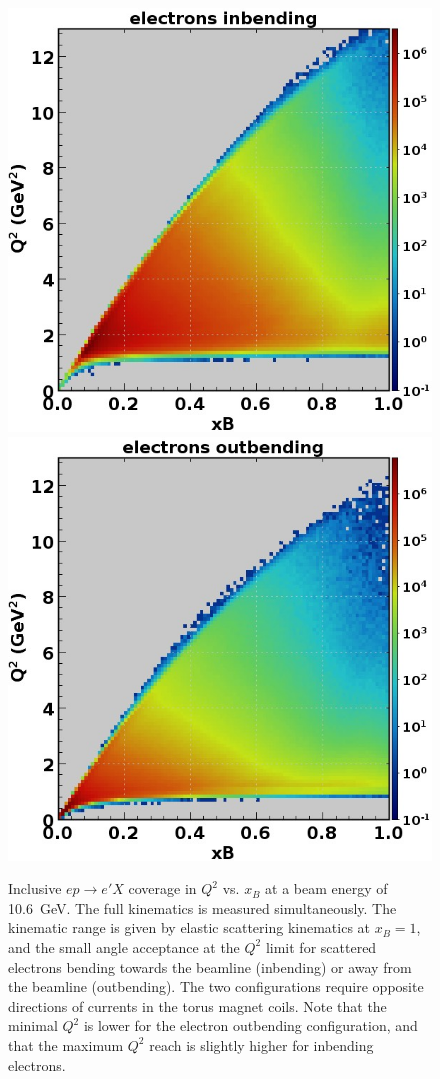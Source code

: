 \documentclass[final,3p,twocolumn]{elsarticle}
\begin{document}
\begin{figure}[th!]
\centerline{\includegraphics[width=0.9\columnwidth]{epX-in.jpg}
\hspace{1cm}\includegraphics[width=0.9\columnwidth]{epX-out.jpg}}
\caption{Inclusive $ep \to e'X$ coverage in $Q^2$ vs. $x_B$ at a beam energy of 10.6~GeV. The full kinematics is
  measured simultaneously. The kinematic range is given by elastic scattering kinematics at $x_B = 1$, and the small
  angle acceptance at the $Q^2$ limit for scattered electrons bending towards the beamline (inbending) or away
  from the beamline (outbending). The two configurations require opposite directions of currents in the torus magnet
  coils. Note that the minimal $Q^2$ is lower for the electron outbending configuration, and that the maximum $Q^2$
  reach is slightly higher for inbending electrons.} 
\label{electron-acceptance}
\end{figure}
\end{document}
